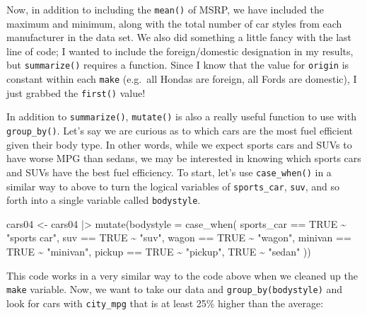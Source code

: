 \documentclass[
  letterpaper,
]{book}
\newenvironment{Shaded}{\begin{snugshade}}{\end{snugshade}}
\newcommand{\AttributeTok}[1]{\textcolor[rgb]{0.40,0.45,0.13}{#1}}
\newcommand{\ConstantTok}[1]{\textcolor[rgb]{0.56,0.35,0.01}{#1}}
\newcommand{\FunctionTok}[1]{\textcolor[rgb]{0.28,0.35,0.67}{#1}}
\newcommand{\NormalTok}[1]{\textcolor[rgb]{0.00,0.23,0.31}{#1}}
\newcommand{\OtherTok}[1]{\textcolor[rgb]{0.00,0.23,0.31}{#1}}
\newcommand{\SpecialCharTok}[1]{\textcolor[rgb]{0.37,0.37,0.37}{#1}}
\newcommand{\StringTok}[1]{\textcolor[rgb]{0.13,0.47,0.30}{#1}}
\begin{document}
Now, in addition to including the \texttt{mean()} of MSRP, we have
included the maximum and minimum, along with the total number of car
styles from each manufacturer in the data set. We also did something a
little fancy with the last line of code; I wanted to include the
foreign/domestic designation in my results, but \texttt{summarize()}
requires a function. Since I know that the value for \texttt{origin} is
constant within each \texttt{make} (e.g.~all Hondas are foreign, all
Fords are domestic), I just grabbed the \texttt{first()} value!

In addition to \texttt{summarize()}, \texttt{mutate()} is also a really
useful function to use with \texttt{group\_by()}. Let's say we are
curious as to which cars are the most fuel efficient given their body
type. In other words, while we expect sports cars and SUVs to have worse
MPG than sedans, we may be interested in knowing which sports cars and
SUVs have the best fuel efficiency. To start, let's use
\texttt{case\_when()} in a similar way to above to turn the logical
variables of \texttt{sports\_car}, \texttt{suv}, and so forth into a
single variable called \texttt{bodystyle}.

\begin{Shaded}
\begin{Highlighting}[]
\NormalTok{cars04 }\OtherTok{\textless{}{-}}\NormalTok{ cars04 }\SpecialCharTok{|\textgreater{}} 
  \FunctionTok{mutate}\NormalTok{(}\AttributeTok{bodystyle =} \FunctionTok{case\_when}\NormalTok{(}
\NormalTok{    sports\_car }\SpecialCharTok{==} \ConstantTok{TRUE} \SpecialCharTok{\textasciitilde{}} \StringTok{"sports car"}\NormalTok{,}
\NormalTok{    suv }\SpecialCharTok{==} \ConstantTok{TRUE} \SpecialCharTok{\textasciitilde{}} \StringTok{"suv"}\NormalTok{,}
\NormalTok{    wagon }\SpecialCharTok{==} \ConstantTok{TRUE} \SpecialCharTok{\textasciitilde{}} \StringTok{"wagon"}\NormalTok{,}
\NormalTok{    minivan }\SpecialCharTok{==} \ConstantTok{TRUE} \SpecialCharTok{\textasciitilde{}} \StringTok{"minivan"}\NormalTok{,}
\NormalTok{    pickup }\SpecialCharTok{==} \ConstantTok{TRUE} \SpecialCharTok{\textasciitilde{}} \StringTok{"pickup"}\NormalTok{,}
    \ConstantTok{TRUE} \SpecialCharTok{\textasciitilde{}} \StringTok{"sedan"}
\NormalTok{  ))}
\end{Highlighting}
\end{Shaded}

This code works in a very similar way to the code above when we cleaned
up the \texttt{make} variable. Now, we want to take our data and
\texttt{group\_by(bodystyle)} and look for cars with \texttt{city\_mpg}
that is at least 25\% higher than the average:
\end{document}
